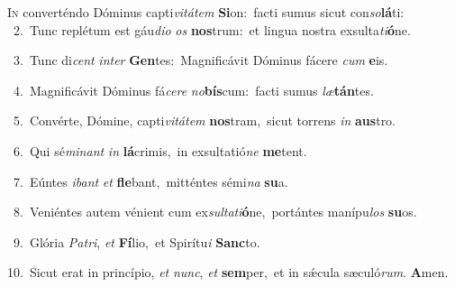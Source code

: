 \lettrine{\initial\textcolor{\initialcolor}{I}}{n} converténdo Dóminus capti\-\textit{vi}\-\textit{tá}\textit{tem} \textbf{Si}\-on:~\star facti sumus sicut con\-\textit{so}\-\textbf{lá}ti:\\
{\numbfont\textcolor{\numbcolor}{~2.}}~Tunc replétum est gáu\-\textit{di}\-\textit{o} \textit{os} \textbf{nos}\-trum:~\star et lingua nostra exsulta\-\textit{ti}\-\textbf{ó}ne.\par
{\numbfont\textcolor{\numbcolor}{~3.}}~Tunc di\textit{cent} \textit{in}\-\textit{ter} \textbf{Gen}\-tes:~\star Magnificávit Dóminus fácere \textit{cum} \textbf{e}\-is.\par
{\numbfont\textcolor{\numbcolor}{~4.}}~Magnificávit Dóminus fá\-\textit{ce}\-\textit{re} \textit{no}\-\textbf{bís}cum:~\star facti sumus \textit{læ}\-\textbf{tán}tes.\par
{\numbfont\textcolor{\numbcolor}{~5.}}~Convérte, Dómine, capti\-\textit{vi}\-\textit{tá}\textit{tem} \textbf{nos}\-tram,~\star sicut torrens \textit{in} \textbf{aus}\-tro.\par
{\numbfont\textcolor{\numbcolor}{~6.}}~Qui sé\-\textit{mi}\-\textit{nant} \textit{in} \textbf{lá}\-crimis,~\star in exsultatió\textit{ne} \textbf{me}\-tent.\par
{\numbfont\textcolor{\numbcolor}{~7.}}~Eúntes \textit{i}\-\textit{bant} \textit{et} \textbf{fle}\-bant,~\star mitténtes sémi\textit{na} \textbf{su}\-a.\par
{\numbfont\textcolor{\numbcolor}{~8.}}~Veniéntes autem vénient cum ex\-\textit{sul}\-\textit{ta}\textit{ti}\textbf{ó}ne,~\star portántes manípu\textit{los} \textbf{su}\-os.\par
{\numbfont\textcolor{\numbcolor}{~9.}}~Glória \textit{Pa}\-\textit{tri}, \textit{et} \textbf{Fí}\-lio,~\star et Spirítu\textit{i} \textbf{Sanc}\-to.\par
{\numbfont\textcolor{\numbcolor}{10.}}~Sicut erat in princípio, \textit{et} \textit{nunc}\-, \textit{et} \textbf{sem}\-per,~\star et in sǽcula sæculó\-\textit{rum}\-. \textbf{A}\-men.\par
